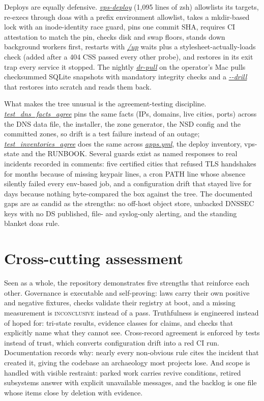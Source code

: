 \documentclass[oneside]{article}
\newcommand{\fpath}[1]{\emph{\url{#1}}}
\begin{document}
Deploys are equally defensive. \fpath{vps-deploy} (1,095 lines of zsh) allowlists its targets, re-execs through doas with a prefix environment allowlist, takes a mkdir-based lock with an inode-identity race guard, pins one commit SHA, requires CI attestation to match the pin, checks disk and swap floors, stands down background workers first, restarts with \fpath{/up} waits plus a stylesheet-actually-loads check (added after a 404 CSS passed every other probe), and restores in its exit trap every service it stopped. The nightly \fpath{dr-pull} on the operator's Mac pulls checksummed SQLite snapshots with mandatory integrity checks and a \fpath{--drill} that restores into scratch and reads them back.

What makes the tree unusual is the agreement-testing discipline. \fpath{test_dns_facts_agree} pins the same facts (IPs, domains, live cities, ports) across the DNS data file, the installer, the zone generator, the NSD config and the committed zones, so drift is a test failure instead of an outage; \fpath{test_inventories_agree} does the same across \fpath{apps.yml}, the deploy inventory, vps-state and the RUNBOOK. Several guards exist as named responses to real incidents recorded in comments: five certified cities that refused TLS handshakes for months because of missing keypair lines, a cron PATH line whose absence silently failed every env-based job, and a configuration drift that stayed live for days because nothing byte-compared the box against the tree. The documented gaps are as candid as the strengths: no off-host object store, unbacked DNSSEC keys with no DS published, file- and syslog-only alerting, and the standing blanket doas rule.

\section{Cross-cutting assessment}

Seen as a whole, the repository demonstrates five strengths that reinforce each other. Governance is executable and self-proving: laws carry their own positive and negative fixtures, checks validate their registry at boot, and a missing measurement is \textsc{inconclusive} instead of a pass. Truthfulness is engineered instead of hoped for: tri-state results, evidence classes for claims, and checks that explicitly name what they cannot see. Cross-record agreement is enforced by tests instead of trust, which converts configuration drift into a red CI run. Documentation records why: nearly every non-obvious rule cites the incident that created it, giving the codebase an archaeology most projects lose. And scope is handled with visible restraint: parked work carries revive conditions, retired subsystems answer with explicit unavailable messages, and the backlog is one file whose items close by deletion with evidence.
\end{document}
